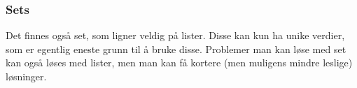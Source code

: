



\begin{frame}
    \frametitle{Sets}

    Det finnes også set, som ligner veldig på lister. Disse kan kun ha unike verdier, som er egentlig eneste grunn til å bruke disse. Problemer man kan løse med set kan også løses med lister, men man kan få kortere (men muligens mindre leslige) løsninger. 

\end{frame}
